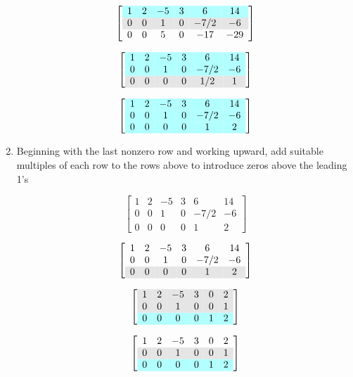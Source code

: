\documentclass[a4paper, 12pt]{article}
\begin{document}
\begin{enumerate}
\[ \left[ {\begin{array}{cccccc}
\rowcolor{LightCyan}
1 & 2 & -5 & 3 & 6 & 14 \\
\rowcolor{Gray}
0 & 0 & 1  & 0 & -7/2 & -6 \\
0 & 0 & 5 & 0 & -17 & -29
\end{array}} \right] \]

\[ \left[ {\begin{array}{cccccc}
\rowcolor{LightCyan}
1 & 2 & -5 & 3 & 6 & 14 \\
\rowcolor{LightCyan}
0 & 0 & 1  & 0 & -7/2 & -6 \\
\rowcolor{Gray}
0 & 0 & 0  & 0 & 1/2  & 1 
\end{array}} \right] \]

\[ \left[ {\begin{array}{cccccc}
\rowcolor{LightCyan}
1 & 2 & -5 & 3 & 6 & 14 \\
\rowcolor{LightCyan}
0 & 0 & 1  & 0 & -7/2 & -6 \\
\rowcolor{LightCyan}
0 & 0 & 0  & 0 & 1  & 2 
\end{array}} \right] \]

\item Beginning with the last nonzero row and working upward, add suitable
multiples of each row to the rows above to introduce zeros above the 
leading 1's

\[ \left[ {\begin{array}{cccccc}
1 & 2 & -5 & 3 & 6 & 14 \\
0 & 0 & 1  & 0 & -7/2 & -6 \\
0 & 0 & 0  & 0 & 1  & 2 
\end{array}} \right] \]



\[ \left[ {\begin{array}{cccccc}
1 & 2 & -5 & 3 & 6 & 14 \\
0 & 0 & 1  & 0 & -7/2 & -6 \\
\rowcolor{Gray}
0 & 0 & 0  & 0 & 1  & 2 
\end{array}} \right] \]



\[ \left[ {\begin{array}{cccccc}
\rowcolor{Gray}
1 & 2 & -5 & 3 & 0 & 2 \\
\rowcolor{Gray}
0 & 0 & 1  & 0 & 0 & 1\\
\rowcolor{LightCyan}
0 & 0 & 0  & 0 & 1  & 2 
\end{array}} \right] \]

\[ \left[ {\begin{array}{cccccc} 
1 & 2 & -5 & 3 & 0 & 2 \\ 
\rowcolor{Gray}
0 & 0 & 1  & 0 & 0 & 1\\
\rowcolor{LightCyan}
0 & 0 & 0  & 0 & 1  & 2 
\end{array}} \right] \]


\end{enumerate}
\end{document}
